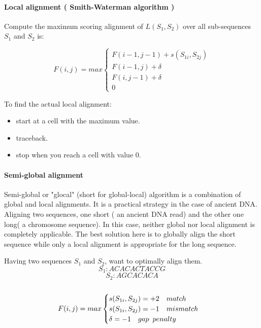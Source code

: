 \documentclass[11pt,a4paper]{report}
\begin{document}
\paragraph{ Local alignment ( Smith-Waterman algorithm ) }

Compute the maximum scoring alignment of $L(S_{1}, S_{2})$ over all 
sub-sequences $S_{1}$ and $S_{2}$ is:


\[ F(i,j)= max
\begin{cases}
   F(i-1,j-1) + s(S_{1i} , S_{2j})\\
   F(i-1 , j)+ \delta\\
   F(i,j-1)+ \delta\\
   0 \quad  
\end{cases}
\]

To find the actual local alignment:
\begin{itemize}
 \item start at a cell with the maximum value.
 \item traceback.
 \item stop when you reach a cell with value 0.
\end{itemize} 






\paragraph{Semi-global alignment}

Semi-global or "glocal" (short for global-local) algorithm is a combination 
of global and local alignments. 
It is a practical strategy in the case of ancient DNA.
Aligning two sequences, one short ( an ancient DNA read) and the 
other one long( a chromosome sequence). In this case, neither global 
nor local alignment is completely applicable. The best solution here 
is to globally align the short sequence while only a local alignment
is appropriate for the long sequence.


Having two sequences  $S_{1}$ and $S_{2}$, want to optimally align them.
$$S_{1}:ACACACTACCG$$
$$S_{2}:AGCACACA$$\\

\[ F(i,j)= max
\begin{cases}
   s(S_{1i},S_{2j})= +2 \quad match \\
   s(S_{1i},S_{2j})= -1 \quad mismatch \\
  \delta = -1  \quad gap \enskip  penalty \\ 
\end{cases}
\] \\
\end{document}
